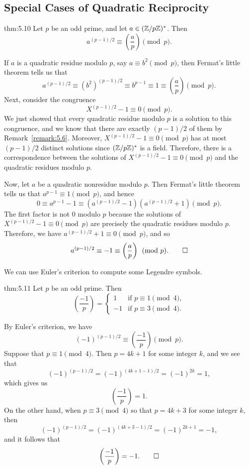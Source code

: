 \subsection{Special Cases of Quadratic Reciprocity}\label{subsec:5.3}

\vspace{2ex}
\begin{theo}{thm:5.10}
    Let $p$ be an odd prime, and let $a \in (\mathbb{Z}/p\mathbb{Z})^*$. Then 
    \[ a^{(p-1)/2} \equiv \left( \frac ap \right) \pmod p. \] 
\end{theo}
\begin{pf}
    If $a$ is a quadratic residue modulo $p$, say $a \equiv b^2 \pmod p$, then 
    Fermat's little theorem tells us that 
    \[ a^{(p-1)/2} \equiv (b^2)^{(p-1)/2} \equiv b^{p-1} \equiv 1 \equiv 
    \left( \frac ap \right) \pmod p. \] 
    Next, consider the congruence 
    \[ X^{(p-1)/2} - 1 \equiv 0 \pmod p. \] 
    We just showed that every quadratic residue modulo $p$ is a solution to this 
    congruence, and we know that there are exactly $(p-1)/2$ of them by 
    Remark~\ref{remark:5.6}. Moreover, $X^{(p-1)/2} - 1 \equiv 0 \pmod p$ 
    has at most $(p-1)/2$ distinct solutions since $(\mathbb{Z}/p\mathbb{Z})^*$ is a field. 
    Therefore, there is a correspondence between the solutions of 
    $X^{(p-1)/2} - 1 \equiv 0 \pmod p$ and the quadratic residues modulo $p$. 

    Now, let $a$ be a quadratic nonresidue modulo $p$. Then Fermat's little 
    theorem tells us that $a^{p-1} \equiv 1 \pmod p$, and hence 
    \[ 0 \equiv a^{p-1} - 1 \equiv \left( a^{(p-1)/2} - 1 \right) 
    \left( a^{(p-1)/2} + 1 \right) \pmod p. \] 
    The first factor is not $0$ modulo $p$ because the solutions of $X^{(p-1)/2}
    - 1 \equiv 0 \pmod p$ are precisely the quadratic residues modulo $p$. 
    Therefore, we have $a^{(p-1)/2} + 1 \equiv 0 \pmod p$, and so 
    \[ a^{(p-1)/2} \equiv -1 \equiv \left( \frac ap \right) \pmod p. \qedhere \] 
\end{pf}

We can use Euler's criterion to compute some Legendre symbols. 

\begin{theo}{thm:5.11}
    Let $p$ be an odd prime. Then 
    \[ \left( \frac{-1}p \right) = \begin{cases}
        1 & \text{if } p \equiv 1 \pmod 4, \\ 
        -1 & \text{if } p \equiv 3 \pmod 4. 
    \end{cases} \] 
\end{theo}
\begin{pf}
    By Euler's criterion, we have 
    \[ (-1)^{(p-1)/2} \equiv \left( \frac{-1}p \right) \pmod p. \] 
    Suppose that $p \equiv 1 \pmod 4$. Then $p = 4k+1$ for some integer $k$, and 
    we see that 
    \[ (-1)^{(p-1)/2} = (-1)^{(4k+1-1)/2} = (-1)^{2k} = 1, \] 
    which gives us 
    \[ \left( \frac{-1}p \right) = 1. \] 
    On the other hand, when $p \equiv 3 \pmod 4$ so that $p = 4k+3$ for some 
    integer $k$, then 
    \[ (-1)^{(p-1)/2} = (-1)^{(4k+3-1)/2} = (-1)^{2k+1} = -1, \] 
    and it follows that 
    \[ \left( \frac{-1}p \right) = -1. \qedhere \] 
\end{pf}

